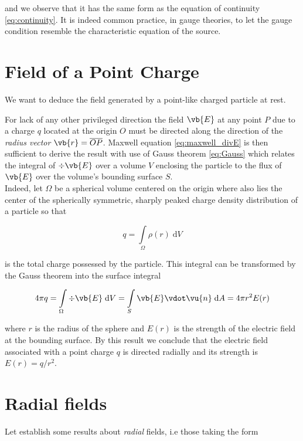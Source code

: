 and we observe that it has the same form as the equation of continuity \ref{eq:continuity}. It is indeed common practice, in gauge theories, to let the gauge condition resemble the characteristic equation of the source. 

\section{Field of a Point Charge} 
We want to deduce the field generated by a point-like charged particle at rest. 

For lack of any other privileged direction the field $\vb{E}$ at any point $P$ due to a charge $q$ located at the origin $O$ must be directed along the direction of the \textit{radius vector} $\vb{r} = \overline{OP}$. Maxwell equation \ref{eq:maxwell_divE} is then sufficient to derive the result with use of Gauss theorem \ref{eq:Gauss} which relates the integral of $\div{\vb{E}}$ over a volume $V$ enclosing the particle to the flux of $\vb{E}$ over the volume's bounding surface $S$. \\

Indeed, let $\Omega$ be a spherical volume centered on the origin where also lies the center of the spherically symmetric, sharply peaked charge density distribution of a particle so that 

\begin{equation}
q = \int\limits_{\Omega} \rho(r) \; \mathrm{d}V 
\end{equation}

is the total charge possessed by the particle. This integral can be transformed by the Gauss theorem into the surface integral 

\begin{equation}
4 \pi q = \int\limits_{\Omega}\div{\vb{E}} \; \mathrm{d}V = \int\limits_{S}\vb{E} \vdot \vu{n} \; \mathrm{d}A = 4 \pi r^2 E(r) \label{eq:pointcharge_flux}
\end{equation}

where $r$ is the radius of the sphere and $E(r)$ is the strength of the electric field at the bounding surface. By this result we conclude that the electric field associated with a point charge $q$ is directed radially and its strength is
$E(r) = q/r^2$.



\section{Radial fields} 
Let establish some results about \textit{radial} fields, i.e those taking the form 

